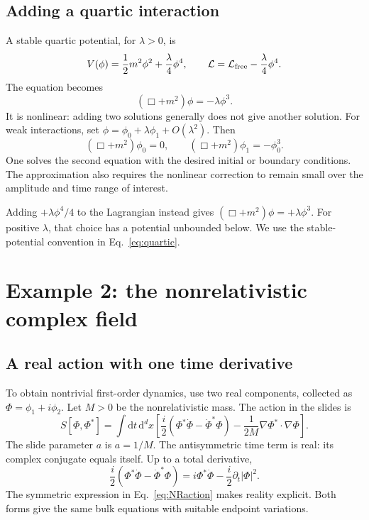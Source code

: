 \documentclass[11pt]{article}
\newcommand{\dd}{\mathrm{d}}
\newcommand{\Lag}{\mathcal{L}}
\begin{document}
\subsection{Adding a quartic interaction}

A stable quartic potential, for \(\lambda>0\), is
\begin{equation}
V(\phi)=\frac12m^2\phi^2+\frac{\lambda}{4}\phi^4,
\qquad
\Lag=\Lag_{\rm free}-\frac{\lambda}{4}\phi^4.
\end{equation}
The equation becomes
\begin{equation}
(\Box+m^2)\phi=-\lambda\phi^3.
\label{eq:quartic}
\end{equation}
It is nonlinear: adding two solutions generally does not give another
solution. For weak interactions, set
\(\phi=\phi_0+\lambda\phi_1+O(\lambda^2)\). Then
\begin{equation}
(\Box+m^2)\phi_0=0,
\qquad
(\Box+m^2)\phi_1=-\phi_0^3.
\end{equation}
One solves the second equation with the desired initial or boundary
conditions. The approximation also requires the nonlinear correction to
remain small over the amplitude and time range of interest.

\begin{warningbox}
Adding \(+\lambda\phi^4/4\) to the Lagrangian instead gives
\((\Box+m^2)\phi=+\lambda\phi^3\). For positive \(\lambda\), that choice
has a potential unbounded below. We use the stable-potential convention in
Eq.~\eqref{eq:quartic}.
\end{warningbox}

\section{Example 2: the nonrelativistic complex field}

\subsection{A real action with one time derivative}

To obtain nontrivial first-order dynamics, use two
real components, collected as \(\Phi=\phi_1+i\phi_2\). Let \(M>0\) be the
nonrelativistic mass. The action in the slides is
\begin{equation}
S[\Phi,\Phi^*]=\int\dd t\,\dd^d x\left[
\frac{i}{2}(\Phi^*\dot\Phi-\dot\Phi^*\Phi)
-\frac{1}{2M}\nabla\Phi^*\cdot\nabla\Phi\right].
\label{eq:NRaction}
\end{equation}
The slide parameter \(a\) is \(a=1/M\). The antisymmetric time term is real:
its complex conjugate equals itself. Up to a total derivative,
\begin{equation}
\frac{i}{2}(\Phi^*\dot\Phi-\dot\Phi^*\Phi)
=i\Phi^*\dot\Phi-\frac{i}{2}\partial_t|\Phi|^2.
\end{equation}
The symmetric expression in Eq.~\eqref{eq:NRaction} makes reality explicit.
Both forms give the same bulk equations with suitable endpoint variations.
\end{document}
